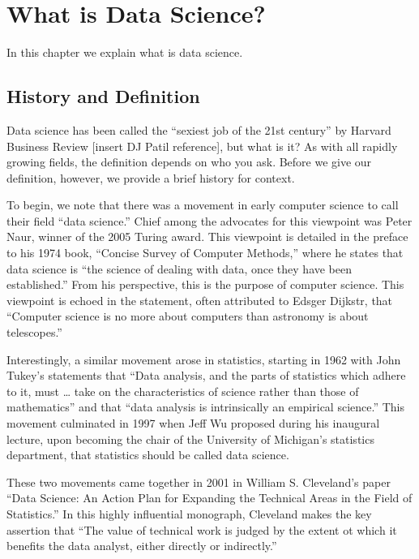 \documentclass[
]{book}
\begin{document}
\hypertarget{data_science}{%
\chapter{What is Data Science?}\label{data_science}}

In this chapter we explain what is data science.

\hypertarget{history-and-definition}{%
\section{History and Definition}\label{history-and-definition}}

Data science has been called the ``sexiest job of the 21st century'' by Harvard Business Review {[}insert DJ Patil reference{]}, but what is it? As with all rapidly growing fields, the definition depends on who you ask. Before we give our definition, however, we provide a brief history for context.

To begin, we note that there was a movement in early computer science to call their field ``data science.'' Chief among the advocates for this viewpoint was Peter Naur, winner of the 2005 Turing award. This viewpoint is detailed in the preface to his 1974 book, ``Concise Survey of Computer Methods,'' where he states that data science is ``the science of dealing with data, once they have been established.'' From his perspective, this is the purpose of computer science. This viewpoint is echoed in the statement, often attributed to Edsger Dijkstr, that ``Computer science is no more about computers than astronomy is about telescopes.''

Interestingly, a similar movement arose in statistics, starting in 1962 with John Tukey's statements that ``Data analysis, and the parts of statistics which adhere to it, must \ldots{} take on the characteristics of science rather than those of mathematics'' and that ``data analysis is intrinsically an empirical science.'' This movement culminated in 1997 when Jeff Wu proposed during his inaugural lecture, upon becoming the chair of the University of Michigan's statistics department, that statistics should be called data science.

These two movements came together in 2001 in William S. Cleveland's paper ``Data Science: An Action Plan for Expanding the Technical Areas in the Field of Statistics.'' In this highly influential monograph, Cleveland makes the key assertion that ``The value of technical work is judged by the extent ot which it benefits the data analyst, either directly or indirectly.''
\end{document}
